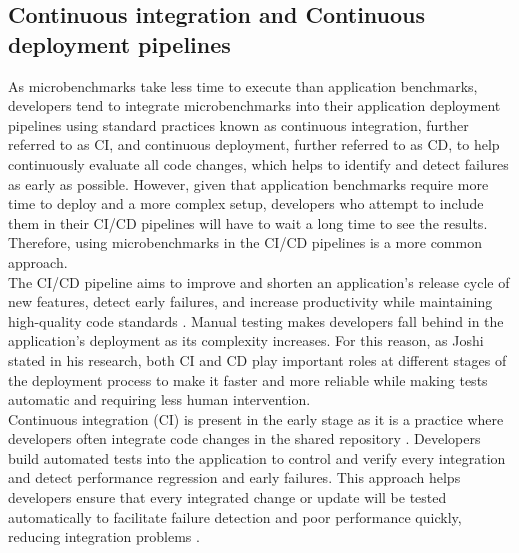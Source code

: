 \subsection{Continuous integration and Continuous deployment pipelines}
\label{sec:continuousIntegrationAndContinousDeplymentPipelines}
As microbenchmarks take less time to execute than application benchmarks, developers tend to integrate microbenchmarks into their application deployment pipelines using standard practices known as continuous integration, further referred to as \ac{CI}, and continuous deployment, further referred to as \ac{CD}, to help continuously evaluate all code changes, which helps to identify and detect failures as early as possible. However, given that application benchmarks require more time to deploy and a more complex setup, developers who attempt to include them in their \ac{CI}/\ac{CD} pipelines will have to wait a long time to see the results. Therefore, using microbenchmarks in the \ac{CI}/\ac{CD} pipelines is a more common approach. \\
The \ac{CI}/\ac{CD} pipeline aims to improve and shorten an application's release cycle of new features, detect early failures, and increase productivity while maintaining high-quality code standards \cite{laaber2018evaluationofopensourcesoftware, zampetti2021cicdpipelinesevulution, joshi2022implementingAutomatedTesting, rangnau2020continuoussecuritytesting}. Manual testing makes developers fall behind in the application's deployment as its complexity increases. For this reason, as Joshi \cite{joshi2022implementingAutomatedTesting} stated in his research, both \ac{CI} and \ac{CD} play important roles at different stages of the deployment process to make it faster and more reliable while making tests automatic and requiring less human intervention. \\
Continuous integration (\ac{CI}) is present in the early stage as it is a practice where developers often integrate code changes in the shared repository \cite{zampetti2021cicdpipelinesevulution, goyal2024optimisingcloudbasedcicd, laaber2018evaluationofopensourcesoftware}. Developers build automated tests into the application to control and verify every integration and detect performance regression and early failures. This approach helps developers ensure that every integrated change or update will be tested automatically to facilitate failure detection and poor performance quickly, reducing integration problems \cite{zampetti2021cicdpipelinesevulution, goyal2024optimisingcloudbasedcicd, rangnau2020continuoussecuritytesting}. \\ 
